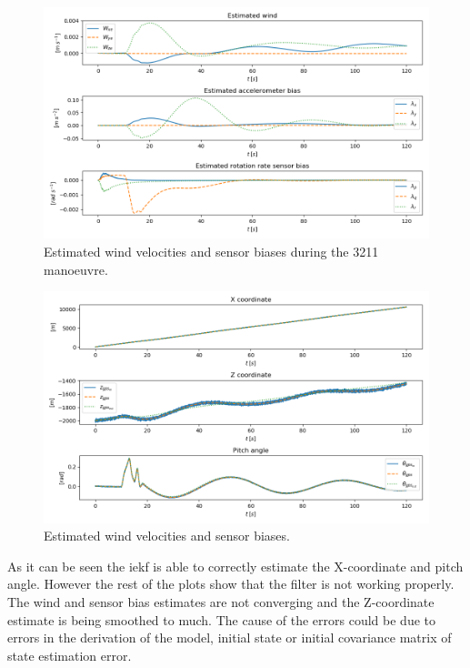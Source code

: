 \begin{figure}
    \centering
    \includegraphics[width=14cm]{figures/iekf_wag}
    \caption{Estimated wind velocities and sensor biases during the 3211 manoeuvre.}
    \label{fig:iekf_wag}
\end{figure}

\begin{figure}
    \centering
    \includegraphics[width=14cm]{figures/iekf_xzphi}
    \caption{Estimated wind velocities and sensor biases.}
    \label{fig:iekf_xzphi}
\end{figure}

As it can be seen the \gls{iekf} is able to correctly estimate the X-coordinate and pitch angle. However the rest of the plots show that the filter is not working properly. The wind and sensor bias estimates are not converging and the Z-coordinate estimate is being smoothed to much. The cause of the errors could be due to errors in the derivation of the model, initial state or initial covariance matrix of state estimation error.































